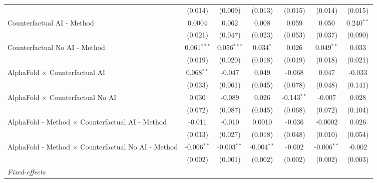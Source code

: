 \begin{tabular}{lcccccc}
                                                              & (0.014)       & (0.009)       & (0.013)       & (0.015)       & (0.014)       & (0.015)\\   
   Counterfactual AI - Method                                 & 0.0004        & 0.062         & 0.008         & 0.059         & 0.050         & 0.240$^{**}$\\   
                                                              & (0.021)       & (0.047)       & (0.023)       & (0.053)       & (0.037)       & (0.090)\\   
   Counterfactual No AI - Method                              & 0.061$^{***}$ & 0.056$^{***}$ & 0.034$^{*}$   & 0.026         & 0.049$^{**}$  & 0.033\\   
                                                              & (0.019)       & (0.020)       & (0.018)       & (0.019)       & (0.018)       & (0.021)\\   
   AlphaFold $\times$ Counterfactual AI                       & 0.068$^{**}$  & -0.047        & 0.049         & -0.068        & 0.047         & -0.033\\   
                                                              & (0.033)       & (0.061)       & (0.045)       & (0.078)       & (0.048)       & (0.141)\\   
   AlphaFold $\times$ Counterfactual No AI                    & 0.030         & -0.089        & 0.026         & -0.143$^{**}$ & -0.007        & 0.028\\   
                                                              & (0.072)       & (0.087)       & (0.045)       & (0.068)       & (0.072)       & (0.104)\\   
   AlphaFold - Method $\times$ Counterfactual AI - Method     & -0.011        & -0.010        & 0.0010        & -0.036        & -0.0002       & 0.026\\   
                                                              & (0.013)       & (0.027)       & (0.018)       & (0.048)       & (0.010)       & (0.054)\\   
   AlphaFold - Method $\times$ Counterfactual No AI - Method  & -0.006$^{**}$ & -0.003$^{**}$ & -0.004$^{**}$ & -0.002        & -0.006$^{**}$ & -0.002\\   
                                                              & (0.002)       & (0.001)       & (0.002)       & (0.002)       & (0.002)       & (0.003)\\   
   \midrule
   \emph{Fixed-effects}\\

\end{tabular}
